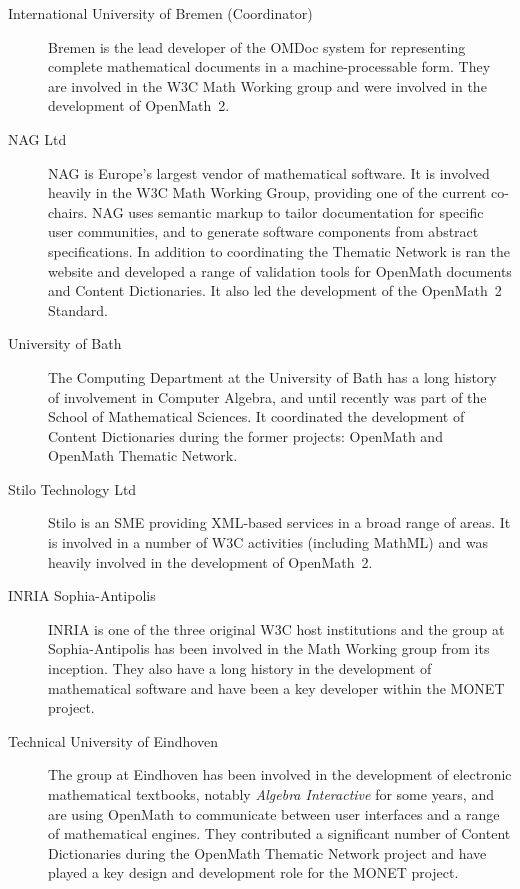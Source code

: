\documentclass{euproposal}
\begin{document}
\begin{description}
\item[International University of Bremen (Coordinator)] Bremen is the lead developer of
  the OMDoc system for representing complete mathematical documents in a
  machine-processable form.  They are involved in the W3C Math Working group and were
  involved in the development of OpenMath~2.
  
\item[NAG Ltd] NAG is Europe's largest vendor of mathematical software.  It is involved
  heavily in the W3C Math Working Group, providing one of the current co-chairs.  NAG uses
  semantic markup to tailor documentation for specific user communities, and to generate
  software components from abstract specifications.  In addition to coordinating the
  Thematic Network is ran the website and developed a range of validation tools for
  OpenMath documents and Content Dictionaries.  It also led the development of the
  OpenMath~2 Standard.
  
\item[University of Bath] The Computing Department at the University of Bath has a long
  history of involvement in Computer Algebra, and until recently was part of the School of
  Mathematical Sciences.  It coordinated the development of Content Dictionaries during
  the former projects: OpenMath and OpenMath Thematic Network.
  
\item[Stilo Technology Ltd] Stilo is an SME providing XML-based services in a broad range
  of areas.  It is involved in a number of W3C activities (including MathML) and was
  heavily involved in the development of OpenMath~2.
  
\item[INRIA Sophia-Antipolis] INRIA is one of the three original W3C host institutions and
  the group at Sophia-Antipolis has been involved in the Math Working group from its
  inception.  They also have a long history in the development of mathematical software
  and have been a key developer within the MONET project.
  
\item[Technical University of Eindhoven] The group at Eindhoven has been involved in the
  development of electronic mathematical textbooks, notably \emph{Algebra Interactive} for
  some years, and are using OpenMath to communicate between user interfaces and a range of
  mathematical engines.  They contributed a significant number of Content Dictionaries
  during the OpenMath Thematic Network project and have played a key design and
  development role for the MONET project.
  

\end{description}
\end{document}
